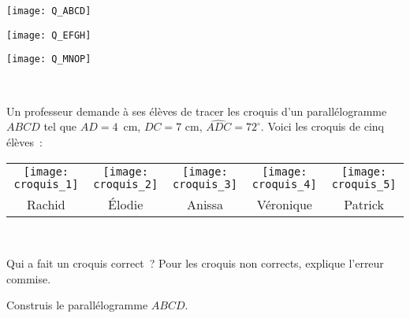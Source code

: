 \begin{activite}
\begin{minipage}[c]{0.26\linewidth}
\vspace{2cm}

\texttt{[image: Q\_ABCD]}

\vspace{1cm}

\texttt{[image: Q\_EFGH]}

\vspace{1cm}

\texttt{[image: Q\_MNOP]}
 \end{minipage} \\

\end{activite}



\begin{activite}
Un professeur demande à ses élèves de tracer les croquis d'un parallélogramme $ABCD$ tel que $AD = 4$ cm, $DC = 7$ cm, $\widehat{ADC} = 72^\circ$. Voici les croquis de cinq élèves : \\[0.5cm]
\begin{tabularx}{0.8\textwidth}{ccccc}
 \texttt{[image: croquis\_1]} & \texttt{[image: croquis\_2]} & \texttt{[image: croquis\_3]} & \texttt{[image: croquis\_4]} & \texttt{[image: croquis\_5]} \\
 Rachid & Élodie & Anissa & Véronique & Patrick \\
\end{tabularx} \\


\begin{partie}
Qui a fait un croquis correct ? Pour les croquis non corrects, explique l'erreur commise.
\end{partie}

\begin{partie}
Construis le parallélogramme $ABCD$.
\end{partie}

\end{activite}


